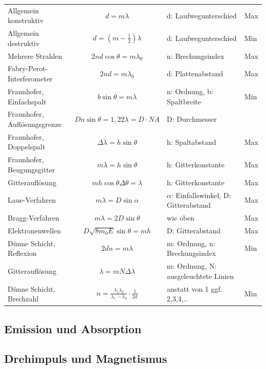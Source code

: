 \documentclass[12pt,a4paper]{article}
\renewcommand{\=}[1]{\stackrel{#1}{=}}
\theoremstyle{definition}
\theoremstyle{remark}
\begin{document}
\noindent
\begin{tabular}{l|c|l|l}
Allgemein konstruktiv & $d = m\lambda$ & d: Laufwegunterschied & Max\\
Allgemein destruktiv & $d = (m-\frac{1}{2})\lambda$ & d: Laufwegunterschied & Min\\
Mehrere Strahlen & $2nd \cos \theta = m \lambda_0$ &n: Brechungsindex & Max\\
Fabry-Perot-Interferometer & $2nd = m \lambda_0$ & d: Plattenabstand & Max\\
Fraunhofer, Einfachspalt & $b \sin \theta = m \lambda$ & n: Ordnung, b: Spaltbreite & Min\\
Fraunhofer, Auflösungsgrenze & $D n \sin \theta = 1,22 \lambda  = D \cdot NA $ & D: Durchmesser & \\
Fraunhofer, Doppelspalt & $\Delta \lambda = h \sin \theta$ & h: Spaltabstand & Max\\
Fraunhofer, Beugungsgitter & $m \lambda = h \sin \theta$ & h: Gitterkonstante & Max\\
Gitterauflösung & $m h \cos \theta \Delta \theta = \lambda$ & h: Gitterkonstante & Max\\
Laue-Verfahren & $m \lambda = D \sin \alpha$ & $\alpha$: Einfallswinkel, D: Gitterabstand & Max\\
Bragg-Verfahren & $m \lambda = 2D \sin \theta$ & wie oben & Max\\
Elektronenwellen & $D \sqrt{8m_0 E} \sin \theta = mh$ & D: Gitterabstand & Max\\
Dünne Schicht, Reflexion & $2dn = m \lambda$ & m: Ordnung, n: Brechungsindex & Min\\
Gitterauflösung & $\lambda = mN \Delta \lambda$ & m: Ordnung, N: ausgeleuchtete Linien & \\
Dünne Schicht, Brechzahl & $n = \frac{\lambda_1 \lambda_2}{\lambda_1 - \lambda_2} \cdot \frac{1}{2d}$ & anstatt von 1 ggf. 2,3,4,.. & Min \\
\end{tabular}


\subsection{Emission und Absorption}

\subsection{Drehimpuls und Magnetismus}
\end{document}
